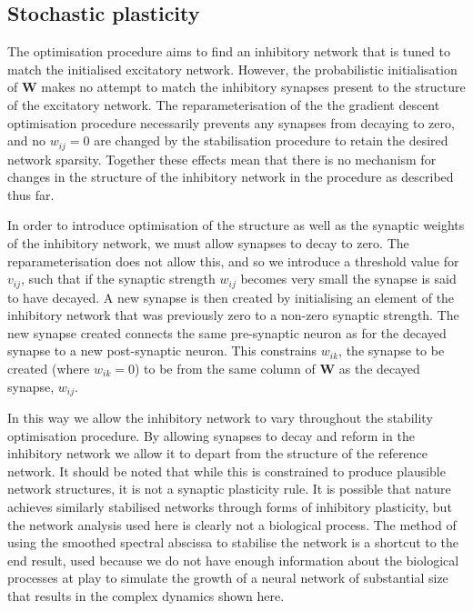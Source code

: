 \documentclass[12pt, a4paper]{article}
\begin{document}
\FloatBarrier
\subsection{Stochastic plasticity}

The optimisation procedure aims to find an inhibitory network that is tuned to match the initialised excitatory network.  However, the probabilistic initialisation of $\mathbf{W}$ makes no attempt to match the inhibitory synapses present to the structure of the excitatory network.  The reparameterisation of the the gradient descent optimisation procedure necessarily prevents any synapses from decaying to zero, and no $w_{ij} = 0$ are changed by the stabilisation procedure to retain the desired network sparsity.  Together these effects mean that there is no mechanism for changes in the structure of the inhibitory network in the procedure as described thus far.

In order to introduce optimisation of the structure as well as the synaptic weights of the inhibitory network, we must allow synapses to decay to zero.  The reparameterisation does not allow this, and so we introduce a threshold value for $v_{ij}$, such that if the synaptic strength $w_{ij}$ becomes very small the synapse is said to have decayed.  A new synapse is then created by initialising an element of the inhibitory network that was previously zero to a non-zero synaptic strength.  The new synapse created connects the same pre-synaptic neuron as for the decayed synapse to a new post-synaptic neuron.  This constrains $w_{ik}$, the synapse to be created (where $w_{ik} = 0$) to be from the same column of $\mathbf{W}$ as the decayed synapse, $w_{ij}$.

In this way we allow the inhibitory network to vary throughout the stability optimisation procedure.  By allowing synapses to decay and reform in the inhibitory network we allow it to depart from the structure of the reference network.  It should be noted that while this is constrained to produce plausible network structures, it is not a synaptic plasticity rule.  It is possible that nature achieves similarly stabilised networks through forms of inhibitory plasticity, but the network analysis used here is clearly not a biological process.  The method of using the smoothed spectral abscissa to stabilise the network is a shortcut to the end result, used because we do not have enough information about the biological processes at play to simulate the growth of a neural network of substantial size that results in the complex dynamics shown here.  
\end{document}
